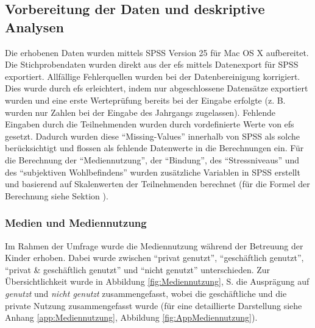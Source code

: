 \subsection{Vorbereitung der Daten und deskriptive Analysen}
Die erhobenen Daten wurden mittels SPSS Version 25 für Mac OS X aufbereitet. Die Stichprobendaten wurden direkt aus der \acrfull{efs} \cite{Questback2018} mittels Datenexport für SPSS exportiert. Allfällige Fehlerquellen wurden bei der Datenbereinigung korrigiert. Dies wurde durch \acrshort{efs} erleichtert, indem nur abgeschlossene Datensätze exportiert wurden und eine erste Werteprüfung bereits bei der Eingabe erfolgte (z. B. wurden nur Zahlen bei der Eingabe des Jahrgangs zugelassen). Fehlende Eingaben durch die Teilnehmenden wurden durch vordefinierte Werte von \acrshort{efs} gesetzt. Dadurch wurden diese \enquote{Missing-Values} innerhalb von SPSS als solche berücksichtigt und flossen als fehlende Datenwerte in die Berechnungen ein. Für die Berechnung der \enquote{Mediennutzung}, der \enquote{Bindung}, des \enquote{Stressniveaus} und des \enquote{subjektiven Wohlbefindens} wurden zusätzliche Variablen in SPSS erstellt und basierend auf Skalenwerten der Teilnehmenden berechnet (für die Formel der Berechnung siehe Sektion \textit{}).

\subsubsection{Medien und Mediennutzung}
Im Rahmen der Umfrage wurde die Mediennutzung während der Betreuung der Kinder erhoben. Dabei wurde zwischen \enquote{privat genutzt}, \enquote{geschäftlich genutzt}, \enquote{privat \& geschäftlich genutzt} und \enquote{nicht genutzt} unterschieden. Zur Übersichtlichkeit wurde in Abbildung \ref{fig:Mediennutzung}, S. \pageref{fig:Mediennutzung} die Ausprägung auf \textit{genutzt} und \textit{nicht genutzt} zusammengefasst, wobei die geschäftliche und die private Nutzung zusammengefasst wurde (für eine detaillierte Darstellung siehe Anhang \ref{app:Mediennutzung}, Abbildung \ref{fig:AppMediennutzung}).


